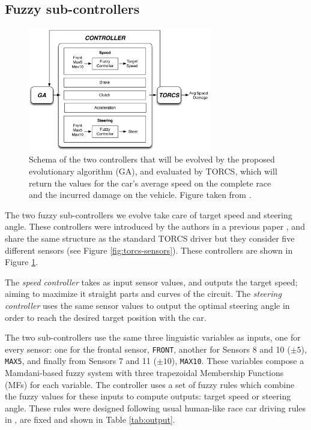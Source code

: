 \documentclass[10pt,journal,compsoc]{IEEEtran}
\begin{document}
\subsection{Fuzzy sub-controllers}
\label{subsec:fuzzy-controllers}

\begin{figure}[!ht]
  \begin{center}
    \includegraphics[width=8cm]{fig/flowchart}
  \end{center}
  \caption{Schema of the two controllers that will be evolved by the proposed 
    evolutionary algorithm (GA), and evaluated by TORCS, which will
    return the values for the car's average speed on the complete race and the incurred damage on the vehicle. Figure taken from \cite{salem_evo18}.} 
    \label{fig:ga}
\end{figure}
%
The two fuzzy sub-controllers we evolve take care of target speed and steering angle. These controllers were introduced by the authors in a previous paper \cite{salem_evo17}, and share the same structure as the standard TORCS driver but they consider five different sensors (see Figure \ref{fig:torcs-sensors}). These controllers are shown in Figure \ref{fig:ga}. 


The \textit{speed controller} takes as input sensor values, and
outputs the target speed; aiming to maximize it straight parts and curves of the circuit. The \textit{steering controller} uses the same sensor values to output the optimal steering angle in order to reach the desired target position with the car.

The two sub-controllers use the same three linguistic variables as
inputs, one for every sensor: one for the frontal sensor,
\texttt{FRONT}, another for Sensors 8 and 10 ($\pm 5$\textdegree),
\texttt{MAX5}, and finally from Sensors 7 and 11 ($\pm
10$\textdegree), \texttt{MAX10}. These variables compose a Mamdani-based fuzzy
system \cite{iancu2012} with three trapezoidal Membership Functions
(MFs) for each variable. The controller uses a set of fuzzy rules
which combine the fuzzy values for these inputs to compute outputs:
target speed or steering angle.
% 
These rules were designed following usual human-like race car driving
rules in \cite{salem_evo18}, are fixed and shown in Table \ref{tab:output}.
\end{document}
